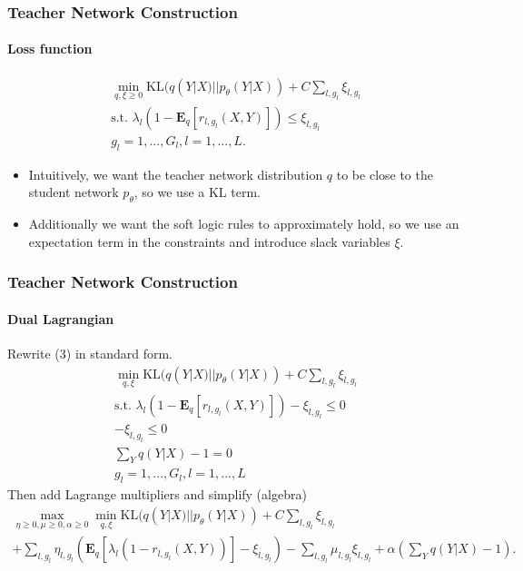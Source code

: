 \documentclass{beamer}
\begin{document}
\begin{frame}
\frametitle{Teacher Network Construction}
\framesubtitle{Loss function}
\begin{equation}
\begin{gathered}
\min_{q, \xi \geq 0}  \text{KL}(q(Y|X) || p_\theta(Y|X)) + C \sum_{l, g_l} \xi_{l, g_l}\\
\text{s.t. } \lambda_l (1 - \mathbf{E}_q[r_{l,g_l}(X, Y)]) \leq \xi_{l, g_l}\\
g_l = 1,...,G_l, l= 1,..., L.
\end{gathered}
\end{equation}

\begin{itemize}
\item Intuitively, we want the teacher network distribution $q$ to be close to the student network $p_\theta$, so we use a KL term. 
\item Additionally we want the soft logic rules to approximately hold, so we use an expectation term in the constraints and introduce slack variables $\xi$.
\end{itemize}
\end{frame}

\begin{frame}
\frametitle{Teacher Network Construction}
\framesubtitle{Dual Lagrangian}
Rewrite (3) in standard form.
\begin{gather*}
\min_{q, \xi} \text{KL}(q(Y|X) || p_\theta(Y|X)) + C \sum_{l, g_l} \xi_{l, g_l}\\
\text{s.t. } \lambda_l (1 - \mathbf{E}_q[r_{l,g_l}(X, Y)]) - \xi_{l, g_l}\leq 0\\
-\xi_{l, g_l} \leq 0\\
\sum_Y q(Y|X) - 1 = 0\\
g_l = 1,...,G_l, l= 1,..., L
\end{gather*}
Then add Lagrange multipliers and simplify (algebra)
\begin{gather*}
\max_{\eta \geq 0, \mu \geq 0, \alpha \geq 0} \min_{q, \xi}  \text{KL}(q(Y|X) || p_\theta(Y|X)) + C \sum_{l, g_l}  \xi_{l, g_l} \\
+ \sum_{l, g_l} \eta_{l, g_l}(\mathbf{E}_q[\lambda_l (1 - r_{l, g_l}(X, Y))] - \xi_{l, g_l}) - \sum_{l, g_l} \mu_{l, g_l}   \xi_{l, g_l} + \alpha(\sum_Y q(Y|X) - 1).
\end{gather*}
\end{frame}
\end{document}
